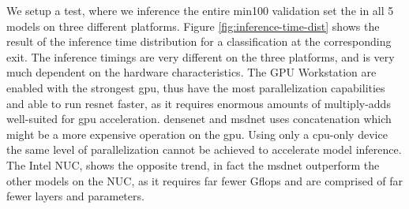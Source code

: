 We setup a test, where we inference the entire \gls{min100} validation set the in all 5 models on three different platforms. Figure \ref{fig:inference-time-dist} shows the result of the inference time distribution for a classification at the corresponding exit. The inference timings are very different on the three platforms, and is very much dependent on the hardware characteristics. The GPU Workstation are enabled with the strongest \gls{gpu}, thus have the most parallelization capabilities and able to run \gls{resnet} faster, as it requires enormous amounts of multiply-adds well-suited for \gls{gpu} acceleration. \gls{densenet} and \gls{msdnet} uses concatenation which might be a more expensive operation on the \gls{gpu}. Using only a \gls{cpu}-only device the same level of parallelization cannot be achieved to accelerate model inference. The Intel NUC, shows the opposite trend, in fact the \gls{msdnet} outperform the other models on the NUC, as it requires far fewer G\gls{flop}s and are comprised of far fewer layers and parameters.


